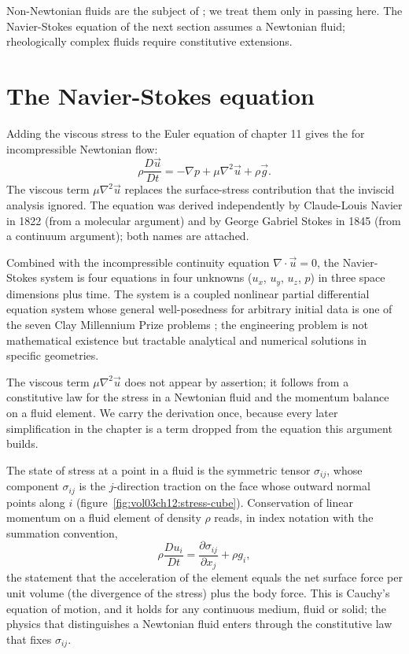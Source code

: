 Non-Newtonian fluids are the subject of ; we
treat them only in passing here. The Navier-Stokes equation of the
next section assumes a Newtonian fluid; rheologically complex
fluids require constitutive extensions.

\section{The Navier-Stokes equation}

Adding the viscous stress to the Euler equation of chapter 11
gives the  for incompressible
Newtonian flow:
\[
\rho\frac{D\vec{u}}{Dt} = -\nabla p + \mu\nabla^2\vec{u} +
\rho\vec{g}.
\]
The viscous term $\mu\nabla^2\vec{u}$ replaces the surface-stress
contribution that the inviscid analysis ignored. The equation was
derived independently by Claude-Louis Navier in 1822 (from a
molecular argument) and by George Gabriel Stokes in 1845 (from a
continuum argument); both names are attached.

Combined with the incompressible continuity equation $\nabla\cdot
\vec{u} = 0$, the Navier-Stokes system is four equations in four
unknowns ($u_x$, $u_y$, $u_z$, $p$) in three space dimensions plus
time. The system is a coupled nonlinear partial differential
equation system whose general well-posedness for arbitrary initial
data is one of the seven Clay Millennium Prize problems
\cite{text:white-fluid-mechanics}; the engineering problem is not
mathematical existence but tractable analytical and numerical
solutions in specific geometries.

 The viscous
term $\mu\nabla^2\vec u$ does not appear by assertion; it follows from
a constitutive law for the stress in a Newtonian fluid and the momentum
balance on a fluid element. We carry the derivation once, because every
later simplification in the chapter is a term dropped from the equation
this argument builds.

The state of stress at a point in a fluid is the symmetric tensor
$\sigma_{ij}$, whose component $\sigma_{ij}$ is the $j$-direction
traction on the face whose outward normal points along $i$
(figure~\ref{fig:vol03ch12:stress-cube}). Conservation of linear
momentum on a fluid element of density $\rho$ reads, in index notation
with the summation convention,
\[
\rho\frac{Du_i}{Dt} = \frac{\partial\sigma_{ij}}{\partial x_j} +
\rho g_i,
\]
the statement that the acceleration of the element equals the net
surface force per unit volume (the divergence of the stress) plus the
body force. This is Cauchy's equation of motion, and it holds for any
continuous medium, fluid or solid; the physics that distinguishes a
Newtonian fluid enters through the constitutive law that fixes
$\sigma_{ij}$.


